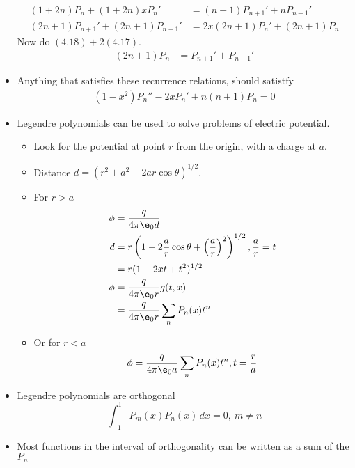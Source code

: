 \documentclass[cplx.tex]{subfiles}
\begin{document}
\begin{itemize}
\begin{align}
            (1+2n)P_n + (1+2n)xP_n' &= (n+1)P_{n+1}' + nP_{n-1}' \\
            (2n+1)P_{n+1}' + (2n+1)P_{n-1}' &= 2x(2n+1)P_n' + (2n+1)P_n 
        \end{align}
        Now do $(4.18) + 2(4.17)$.
        \begin{align}
            (2n+1)P_n &= P_{n+1}' + P_{n-1}'
        \end{align}
    \item Anything that satisfies these recurrence relations, should satistfy
        \begin{align}
            (1-x^2)P_n'' - 2xP_n' + n(n+1)P_n = 0
        \end{align}
    \item Legendre polynomials can be used to solve problems of electric potential.
        \begin{itemize}
            \item Look for the potential at point $r$ from the origin, with a charge at $a$.
            \item Distance $d = (r^2+a^2 - 2ar\cos\theta)^{1/2}$.
            \item For $r > a$
                \begin{align}
                    \phi &= \frac{q}{4\pi\e_0 d} \\
                    d &= r\left(1 - 2\frac{a}{r}\cos\theta + \left(\frac{a}{r}\right)^2\right)^{1/2}, \frac{a}{r} = t \\
                      &= r(1 - 2xt + t^2)^{1/2} \\
                    \phi &= \frac{q}{4\pi\e_0 r}g(t,x) \\
                         &= \frac{q}{4\pi\e_0 r}\sum_n P_n(x)t^n
                \end{align}
            \item Or for $r < a$
                \begin{equation}
                    \phi = \frac{q}{4\pi\e_0 a}\sum_n P_n(x)t^n, t = \frac{r}{a}
                \end{equation}
        \end{itemize}
    \item Legendre polynomials are orthogonal 
        \begin{equation}
            \int_{-1}^1 P_m(x)P_n(x)\,dx = 0, ~ m \neq n 
        \end{equation}
    \item Most functions in the interval of orthogonality can be written as a sum of the $P_n$

\end{itemize}
\end{document}
